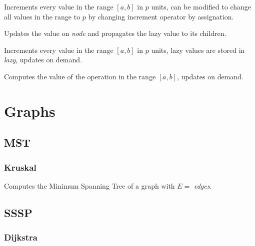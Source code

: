 \documentclass{article}
\begin{document}
\noindent\begin{minipage}{\linewidth}

\end{minipage}
Increments every value in the range $[a, b]$ in $p$ units,
can be modified to change all values in the range to $p$ by changing
increment operator by assignation.

\noindent\begin{minipage}{\linewidth}

\end{minipage}
Updates the value on \textit{node} and propagates
the lazy value to its children.

\noindent\begin{minipage}{\linewidth}

\end{minipage}
Increments every value in the range $[a, b]$ in $p$ units, lazy values
are stored in \textit{lazy}, updates on demand.

\noindent\begin{minipage}{\linewidth}

\end{minipage}
Computes the value of the operation in the range $[a, b]$, updates on demand.

\section{Graphs}
\subsection{MST}
\subsubsection{Kruskal}
\noindent\begin{minipage}{\linewidth}

\end{minipage}
Computes the Minimum Spanning Tree of a graph with $E =$ \textit{edges}.

\subsection{SSSP}
\subsubsection{Dijkstra}
\end{document}
